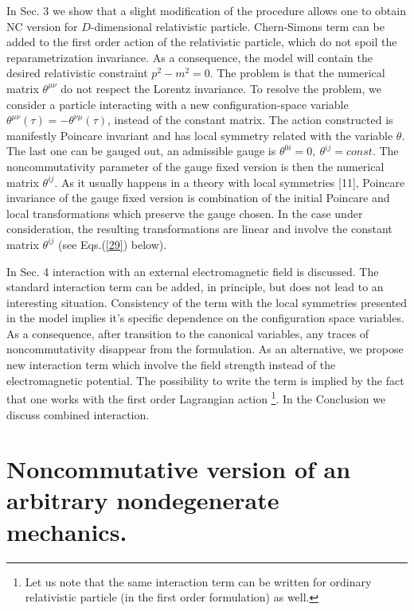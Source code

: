 \documentclass[paper a4]{article}
\begin{document}
In Sec. 3 we show that a slight modification of the procedure allows one
to obtain NC version for $D$-dimensional relativistic
particle. Chern-Simons term can
be added to the first order action of the relativistic particle, which do
not spoil the reparametrization invariance. As a consequence,
the model will contain the desired relativistic constraint $p^2-m^2=0$.
The problem is
that the numerical matrix $\theta^{\mu\nu}$ do not respect the Lorentz
invariance. To resolve the problem, we consider a particle interacting
with a new configuration-space variable
$\theta^{\mu\nu}(\tau)=-\theta^{\nu\mu}(\tau)$,
instead of the constant matrix. The action constructed is manifestly
Poincare invariant and has local symmetry related with the variable
$\theta$. The last one can be gauged out, an admissible gauge is
$\theta^{0i}=0, ~ \theta^{ij}=const$. The noncommutativity parameter of the
gauge fixed version is then the numerical matrix $\theta^{ij}$. As it 
usually happens in a
theory with local symmetries [11], Poincare invariance of the gauge
fixed version is combination of the initial Poincare and local
transformations which preserve the gauge chosen. In the case under
consideration, the resulting transformations are linear and
involve the constant matrix $\theta^{ij}$ (see Eqs.(\ref{29}) below).

In Sec. 4 interaction with an external electromagnetic field is discussed.
The standard interaction term can be added, in principle, but does not
lead to an interesting situation. Consistency of the term with the
local symmetries presented in the model implies it's specific dependence
on the configuration space variables. As a consequence, after transition
to the canonical variables,
any traces of noncommutativity disappear from the formulation.
As an alternative, we propose new interaction term which involve the
field strength instead of the electromagnetic potential. The possibility to
write the term is implied by the fact that one works with the first
order Lagrangian action \footnote{Let us note that the same
interaction term can be written for ordinary relativistic particle
(in the first order formulation) as well.}.
In the Conclusion we discuss combined interaction.

\section{Noncommutative version of an arbitrary nondegenerate mechanics.}
\end{document}
